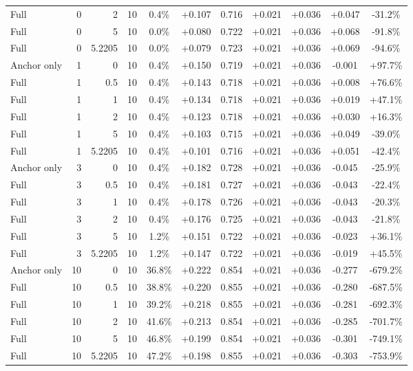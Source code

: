 \begin{table}[htbp]
\begin{tabular}{lrrrccccccc}
Full & 0 & 2 & 10 & 0.4\% & +0.107 & 0.716 & +0.021 & +0.036 & +0.047 & -31.2\% \\
Full & 0 & 5 & 10 & 0.0\% & +0.080 & 0.722 & +0.021 & +0.036 & +0.068 & -91.8\% \\
Full & 0 & 5.2205 & 10 & 0.0\% & +0.079 & 0.723 & +0.021 & +0.036 & +0.069 & -94.6\% \\
Anchor only & 1 & 0 & 10 & 0.4\% & +0.150 & 0.719 & +0.021 & +0.036 & -0.001 & +97.7\% \\
Full & 1 & 0.5 & 10 & 0.4\% & +0.143 & 0.718 & +0.021 & +0.036 & +0.008 & +76.6\% \\
Full & 1 & 1 & 10 & 0.4\% & +0.134 & 0.718 & +0.021 & +0.036 & +0.019 & +47.1\% \\
Full & 1 & 2 & 10 & 0.4\% & +0.123 & 0.718 & +0.021 & +0.036 & +0.030 & +16.3\% \\
Full & 1 & 5 & 10 & 0.4\% & +0.103 & 0.715 & +0.021 & +0.036 & +0.049 & -39.0\% \\
Full & 1 & 5.2205 & 10 & 0.4\% & +0.101 & 0.716 & +0.021 & +0.036 & +0.051 & -42.4\% \\
Anchor only & 3 & 0 & 10 & 0.4\% & +0.182 & 0.728 & +0.021 & +0.036 & -0.045 & -25.9\% \\
Full & 3 & 0.5 & 10 & 0.4\% & +0.181 & 0.727 & +0.021 & +0.036 & -0.043 & -22.4\% \\
Full & 3 & 1 & 10 & 0.4\% & +0.178 & 0.726 & +0.021 & +0.036 & -0.043 & -20.3\% \\
Full & 3 & 2 & 10 & 0.4\% & +0.176 & 0.725 & +0.021 & +0.036 & -0.043 & -21.8\% \\
Full & 3 & 5 & 10 & 1.2\% & +0.151 & 0.722 & +0.021 & +0.036 & -0.023 & +36.1\% \\
Full & 3 & 5.2205 & 10 & 1.2\% & +0.147 & 0.722 & +0.021 & +0.036 & -0.019 & +45.5\% \\
Anchor only & 10 & 0 & 10 & 36.8\% & +0.222 & 0.854 & +0.021 & +0.036 & -0.277 & -679.2\% \\
Full & 10 & 0.5 & 10 & 38.8\% & +0.220 & 0.855 & +0.021 & +0.036 & -0.280 & -687.5\% \\
Full & 10 & 1 & 10 & 39.2\% & +0.218 & 0.855 & +0.021 & +0.036 & -0.281 & -692.3\% \\
Full & 10 & 2 & 10 & 41.6\% & +0.213 & 0.854 & +0.021 & +0.036 & -0.285 & -701.7\% \\
Full & 10 & 5 & 10 & 46.8\% & +0.199 & 0.854 & +0.021 & +0.036 & -0.301 & -749.1\% \\
Full & 10 & 5.2205 & 10 & 47.2\% & +0.198 & 0.855 & +0.021 & +0.036 & -0.303 & -753.9\% \\

\end{tabular}
\end{table}
